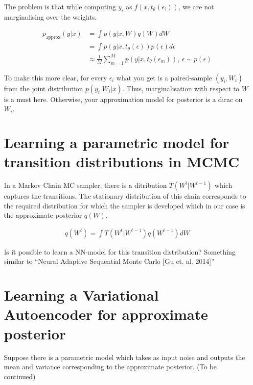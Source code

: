 \documentclass[twoside]{article}
\begin{document}
The problem is that while computing $y_i$ as $f(x,t_\theta(\epsilon_i))$, we are not marginalising over the weights. 

\begin{align}
p_{\text{approx}}(y|x) &= \int p(y|x,W)q(W) dW\\
& = \int p(y|x,t_\theta(\epsilon))p(\epsilon)d\epsilon\\
&\approx \frac{1}{M} \sum_{m=1}^{M} p(y|x,t_\theta(\epsilon_m)), \ \epsilon \sim p(\epsilon)
\end{align}

To make this more clear, for every $\epsilon_i$ what you get is a paired-sample $(y_i,W_i)$ from the joint distribution $p(y_i.W_i|x)$. Thus, marginalisation with respect to $W$ is a must here. Otherwise, your approximation model for posterior is a dirac on $W_i$.

\section{Learning a parametric model for transition distributions in MCMC}

In a Markov Chain MC sampler, there is a ditribution $T(W^{t}|W^{t-1})$ which captures the transitions. The stationary distribution of this chain corresponds to the required distribution for which the sampler is developed which in our case is the approximate posterior $q(W)$. 

\begin{align}
q(W^t) = \int T(W^{t}|W^{t-1})q(W^{t-1})dW
\end{align}

Is it possible to learn a NN-model for this transition distribution? Something similar to ``Neural Adaptive Sequential Monte Carlo [Gu et. al. 2014]''

\section{Learning a Variational Autoencoder for approximate posterior}

Suppose there is a parametric model which takes as input noise and outputs the mean and variance corresponding to the approximate posterior. (To be continued)


%
%
\end{document}

